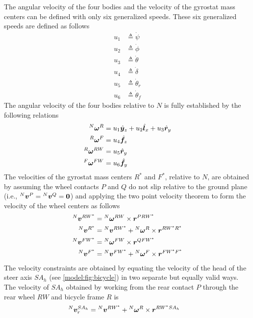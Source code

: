 The angular velocity of the four bodies and the velocity of the gyrostat mass
centers can be defined with only six generalized speeds. These six generalized
speeds are defined as follows
\begin{align}
  u_{1} &\triangleq \dot{\psi} \\
  u_{2} &\triangleq \dot{\phi} \\
  u_{3} &\triangleq \dot{\theta} \\
  u_{4} &\triangleq \dot{\delta} \\
  u_{5} &\triangleq \dot{\theta}_r \\
  u_{6} &\triangleq \dot{\theta}_f
\end{align}
The angular velocity of the four bodies relative to $N$ is fully
established by the following relations
\begin{align}
  {}^{N}\boldsymbol{\omega}^{R} &= u_1 \hat{\boldsymbol{y}}_{z} + u_2 \hat{\boldsymbol{l}}_{x} + u_3\hat{\boldsymbol{r}}_{y} \\
  {}^{R}\boldsymbol{\omega}^{F} &= u_4 \hat{\boldsymbol{f}}_{z} \\
  {}^{R}\boldsymbol{\omega}^{RW} &= u_5 \hat{\boldsymbol{r}}_{y} \\
  {}^{F}\boldsymbol{\omega}^{FW} &= u_6 \hat{\boldsymbol{f}}_{y}
\end{align}
The velocities of the gyrostat mass centers $R^*$ and $F^*$, relative to $N$, are
obtained by assuming the wheel contacts $P$ and $Q$ do not slip relative to the
ground plane (i.e., ${}^{N}\boldsymbol{v}^{P} = {}^{N}\boldsymbol{v}^{Q} = \boldsymbol{0}$) and applying the two
point velocity theorem to form the velocity of the wheel centers as follows
\begin{align}
  {}^{N}\boldsymbol{v}^{RW^*} &= {}^{N}\boldsymbol{\omega}^{RW} \times \boldsymbol{r}^{PRW^*} \\
  {}^{N}\boldsymbol{v}^{R^*} &= {}^{N}\boldsymbol{v}^{RW^*} + {}^{N}\boldsymbol{\omega}^{R} \times \boldsymbol{r}^{RW^*R^*} \\
  {}^{N}\boldsymbol{v}^{FW^*} &= {}^{N}\boldsymbol{\omega}^{FW} \times \boldsymbol{r}^{QFW^*} \\
  {}^{N}\boldsymbol{v}^{F^*} &= {}^{N}\boldsymbol{v}^{FW^*} + {}^{N}\boldsymbol{\omega}^{F} \times \boldsymbol{r}^{FW^*F^*}
\end{align}
The velocity constraints are obtained by equating the velocity of the head of
the steer axis $SA_h$ (see \autoref{model:fig:bicycle}) in two separate but
equally valid ways. The velocity of $SA_h$ obtained by working from the rear
contact $P$ through the rear wheel $RW$ and bicycle frame $R$ is
\begin{align}
  {}^{N}\boldsymbol{v}^{SA_h}_r &= {}^{N}\boldsymbol{v}^{RW^*} + {}^{N}\boldsymbol{\omega}^{R} \times \boldsymbol{r}^{RW^*SA_h}
\end{align}
